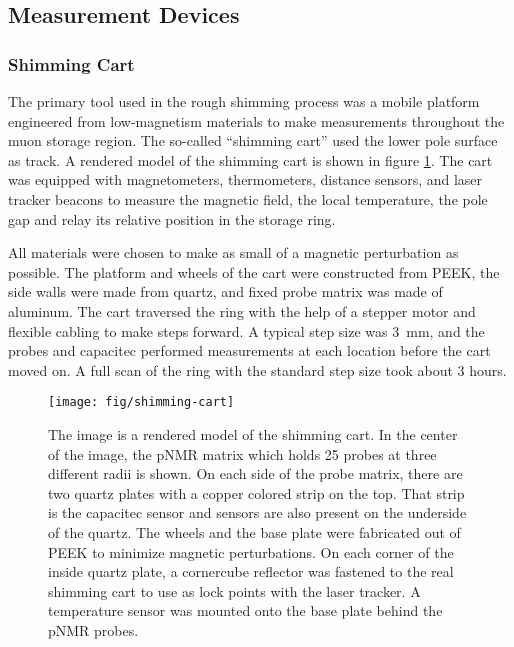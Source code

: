 \subsection{Measurement Devices}

\subsubsection{Shimming Cart}
The primary tool used in the rough shimming process was a mobile platform engineered from low-magnetism materials to make measurements throughout the muon storage region.  The so-called ``shimming cart'' used the lower pole surface as track.  A rendered model of the shimming cart is shown in figure \ref{fig:shimming-cart}.  The cart was equipped with magnetometers, thermometers, distance sensors, and laser tracker beacons to measure the magnetic field, the local temperature, the pole gap and relay its relative position in the storage ring.

All materials were chosen to make as small of a magnetic perturbation as possible.  The platform and wheels of the cart were constructed from PEEK, the side walls were made from quartz, and fixed probe matrix was made of aluminum.  The cart traversed the ring with the help of a stepper motor and flexible cabling to make steps forward.  A typical step size was \SI{3}{\mm}, and the probes and capacitec performed measurements at each location before the cart moved on.  A full scan of the ring with the standard step size took about 3 hours.

\begin{figure}
\centering
\texttt{[image: fig/shimming-cart]}
\caption{
    The image is a rendered model of the shimming cart. In the center of the image, the pNMR matrix which holds 25 probes at three different radii is shown.  On each side of the probe matrix, there are two quartz plates with a copper colored strip on the top.  That strip is the capacitec sensor and sensors are also present on the underside of the quartz.  The wheels and the base plate were fabricated out of PEEK to minimize magnetic perturbations. On each corner of the inside quartz plate, a cornercube reflector was fastened to the real shimming cart to use as lock points with the laser tracker. A temperature sensor was mounted onto the base plate behind the pNMR probes. 
    \label{fig:shimming-cart}
}
\end{figure}

